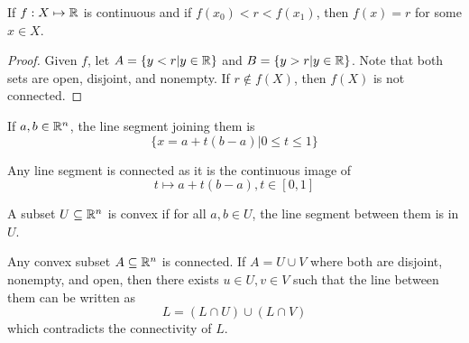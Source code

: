 \documentclass[12pt]{article}
\begin{document}
\begin{prop}
    If $f:X\mapsto\mathbb{R}$ is continuous and if $f(x_0) <r<f(x_1)$, then $f(x)=r$ for some $x\in X$.
\end{prop}

\begin{proof}
    Given $f$, let $A = \{y < r|y\in\mathbb{R}\}$ and $B = \{y > r | y \in \mathbb{R}\}$. Note that both sets are open, disjoint, and nonempty. If $r \notin f(X)$, then $f(X)$ is not connected.
\end{proof}

\begin{defn}
    If $a,b\in\mathbb{R}^n$, the line segment joining them is
    $$\{x = a + t(b-a) | 0 \leq t \leq 1\}$$
\end{defn}

Any line segment is connected as it is the continuous image of
$$t \mapsto a + t(b-a), t \in [0,1]$$

\begin{defn}
    A subset $U \subseteq \mathbb{R}^n$ is convex if for all $a,b\in U$, the line segment between them is in $U$.
\end{defn}

Any convex subset $A \subseteq \mathbb{R}^n$ is connected. If $A = U\cup V$ where both are disjoint, nonempty, and open, then there exists $u\in U,v\in V$ such that the line between them can be written as
$$L = (L\cap U) \cup (L\cap V)$$
which contradicts the connectivity of $L$.
\end{document}
